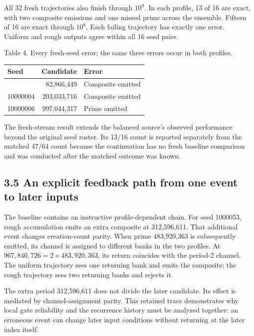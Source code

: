 \documentclass[
  11pt,
]{article}
\newcounter{none} %
\begin{document}
All 32 fresh trajectories also finish through \(10^9\). In each profile,
13 of 16 are exact, with two composite emissions and one missed prime
across the ensemble. Fifteen of 16 are exact through \(10^8\). Each
failing trajectory has exactly one error. Uniform and rough outputs
agree within all 16 seed pairs.

Table 4. Every fresh-seed error; the same three errors occur in both
profiles.

{\def\LTcaptype{none} %
\begin{longtable}[]{@{}lrl@{}}
\toprule\noalign{}
Seed & Candidate & Error \\
\midrule\noalign{}
\endhead
\bottomrule\noalign{}
\endlastfoot
10000012 & 82,866,449 & Composite emitted \\
10000004 & 203,033,716 & Composite emitted \\
10000006 & 997,044,317 & Prime omitted \\
\end{longtable}
}

The fresh-stream result extends the balanced source's observed
performance beyond the original seed roster. Its 13/16 count is reported
separately from the matched 47/64 count because the continuation has no
fresh baseline comparison and was conducted after the matched outcome
was known.

\subsection{3.5 An explicit feedback path from one event to later
inputs}\label{an-explicit-feedback-path-from-one-event-to-later-inputs}

The baseline contains an instructive profile-dependent chain. For seed
1000053, rough accumulation emits an extra composite at 312,596,611.
That additional event changes creation-count parity. When prime
483,920,363 is subsequently emitted, its channel is assigned to
different banks in the two profiles. At
\(967,840,726=2\times483,920,363\), its return coincides with the
period-2 channel. The uniform trajectory sees one returning bank and
emits the composite; the rough trajectory sees two returning banks and
rejects it.

The extra period 312,596,611 does not divide the later candidate. Its
effect is mediated by channel-assignment parity. This retained trace
demonstrates why local gate reliability and the recurrence history must
be analyzed together: an erroneous event can change later input
conditions without returning at the later index itself.
\end{document}
